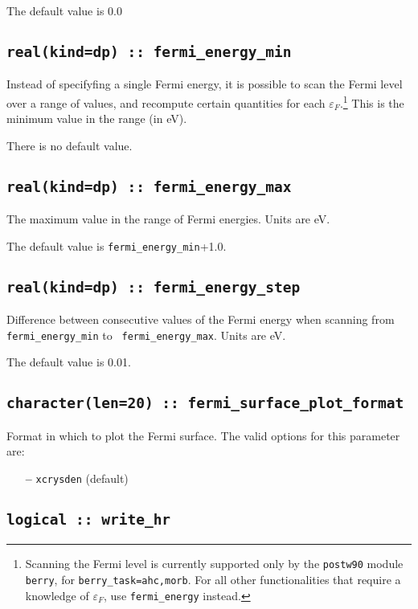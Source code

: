 The default value is 0.0


\subsection[fermi\_energy]{\tt real(kind=dp) :: fermi\_energy\_min}
Instead of specifyfing a single Fermi energy, it is possible to scan
the Fermi level over a range of values, and recompute certain
quantities for each $\varepsilon_F$.\footnote{Scanning the Fermi level
  is currently supported only by the {\tt postw90} module {\tt berry},
  for {\tt berry\_task=ahc,morb}. For all other functionalities that
  require a knowledge of $\varepsilon_F$, use {\tt fermi\_energy}
  instead.}  This is the minimum value in the range (in eV).

There is no default value.

\subsection[fermi\_energy]{\tt real(kind=dp) :: fermi\_energy\_max}
The maximum value in the range of Fermi energies. Units are eV.

The default value is {\tt fermi\_energy\_min}+1.0.

\subsection[fermi\_energy]{\tt real(kind=dp) :: fermi\_energy\_step}
Difference between consecutive values of the Fermi energy when
scanning from {\tt fermi\_energy\_min} to {\tt
  fermi\_energy\_max}. Units are eV.

The default value is 0.01.


\subsection[fermi\_surface\_plot\_format]{\tt character(len=20) ::
  fermi\_surface\_plot\_format}

Format in which to plot the Fermi surface.
The valid options for this parameter are:
\begin{itemize}
\item[{\bf --}] \verb#xcrysden#  (default)
\end{itemize}

\subsection[write\_hr]{\tt logical :: write\_hr}

